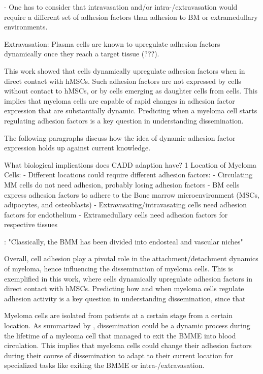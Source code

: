 - One has to consider that intravasation and/or intra-/extravasation would require a different
set of adhesion factors than adhesion to BM or extramedullary environments.

Extravasation: Plasma cells are known to upregulate adhesion factors dynamically
once they reach a target tissue (???).

This work showed that \INA cells dynamically upregulate adhesion factors when in
direct contact with \acp{hMSC}. Such adhesion factors are not expressed by \INA
cells without contact to \acp{hMSC}, or by \INA cells emerging as daughter cells
from \MAina cells. This implies that myeloma cells are capable of rapid changes in
adhesion factor expression that are substantially dynamic.
Predicting when a myeloma cell starts regulating adhesion factors is a key
question in understanding dissemination.

The following paragraphs
discuss how the idea of dynamic adhesion factor expression holds up
against current knowledge.

What biological implications does CADD adaption have?
1 Location of Myeloma Cells:
- Different locations could require different adhesion factors:
- Circulating MM cells do not need adhesion, probably losing adhesion factors
- BM cells express adhesion factors to adhere to the Bone marrow microenvironment (MSCs, adipocytes, and osteoblasts)
- Extravasating/intravasating cells need adhesion factors for endothelium
- Extramedullary cells need adhesion factors for respective tissues


\citet{bouzerdanAdhesionMoleculesMultiple2022}: "Classically, the BMM has been
divided into endosteal and vascular niches"

Overall, cell adhesion play a pivotal role in the attachment/detachment dynamics of
myeloma, hence influencing the dissemination of myeloma cells. This is
exemplified in this work, where \INA cells dynamically upregulate adhesion
factors in direct contact with \acp{hMSC}. Predicting how and when myeloma cells
regulate adhesion activity is a key question in understanding dissemination,
since that

Myeloma cells are isolated from patients at a certain stage from a certain
location. As summarized by \citet{zeissigTumourDisseminationMultiple2020},
dissemination could be a dynamic process during the lifetime of a myleoma cell
that managed to exit the \ac{BMME} into blood circulation. This implies that
myeloma cells could change their adhesion factors during their course of
dissemination to adapt to their current location for specialized tasks like
exiting the \ac{BMME} or intra-/extravasation.

